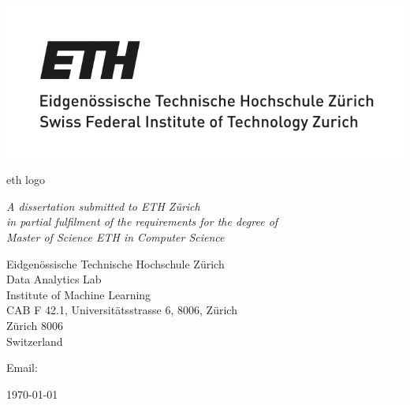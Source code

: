 \begin{titlepage} 

\begin{center}
\noindent
\huge
\dissertationtitle \\
\end{center}

\begin{center}
\noindent
\huge
\authorname \\
\Large
\authorcollege      \\[24pt]
\includegraphics{uni.jpg}
\end{center}

\vspace{24pt} 
eth logo
\begin{center}
\noindent
\large
{\it A dissertation submitted to ETH Zürich \\ 
in partial fulfilment of the requirements for the degree of \\ 
Master of Science ETH in Computer Science} 
\end{center}

\begin{center}
\noindent
Eidgenössische Technische Hochschule Zürich \\
Data Analytics Lab     \\
Institute of Machine Learning  \\
CAB F 42.1, Universitätsstrasse 6, 8006, Zürich\\
Zürich 8006 \\
{\sc Switzerland}    \\
\end{center}

\begin{center}
\noindent
Email: \authoremail \\
\end{center}

\begin{center}
\noindent
\today
\end{center}

\end{titlepage} 

\newpage
\vspace*{\fill}
